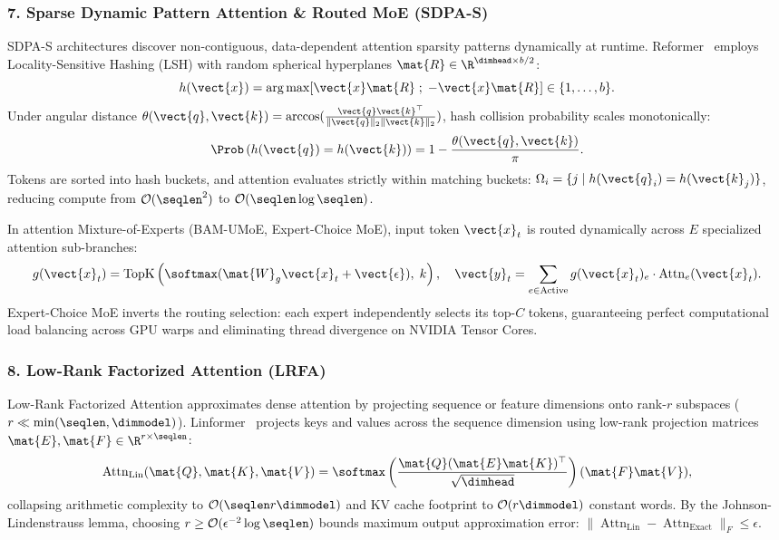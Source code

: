 \subsubsection{7. Sparse Dynamic Pattern Attention \& Routed MoE (SDPA-S)}
\label{subsubsec:sdpas_contract}
SDPA-S architectures discover non-contiguous, data-dependent attention sparsity patterns dynamically at runtime. Reformer~\cite{kitaev2020reformer} employs Locality-Sensitive Hashing (LSH) with random spherical hyperplanes $\mat{R} \in \R^{\dimhead \times b/2}$:
\begin{equation}
h(\vect{x}) = \arg\max [\vect{x}\mat{R} \;;\; -\vect{x}\mat{R}] \in \{1, \dots, b\}.
\end{equation}
Under angular distance $\theta(\vect{q}, \vect{k}) = \arccos(\frac{\vect{q}\vect{k}^\top}{\|\vect{q}\|_2 \|\vect{k}\|_2})$, hash collision probability scales monotonically:
\begin{equation}
\Prob\left( h(\vect{q}) = h(\vect{k}) \right) = 1 - \frac{\theta(\vect{q}, \vect{k})}{\pi}.
\end{equation}
Tokens are sorted into hash buckets, and attention evaluates strictly within matching buckets: $\Omega_i = \{j \mid h(\vect{q}_i) = h(\vect{k}_j)\}$, reducing compute from $\mathcal{O}(\seqlen^2)$ to $\mathcal{O}(\seqlen \log \seqlen)$.

In attention Mixture-of-Experts (BAM-UMoE, Expert-Choice MoE), input token $\vect{x}_t$ is routed dynamically across $E$ specialized attention sub-branches:
\begin{equation}
g(\vect{x}_t) = \operatorname{TopK}\left( \softmax(\mat{W}_g \vect{x}_t + \vect{\epsilon}), \; k \right), \quad \vect{y}_t = \sum_{e \in \text{Active}} g(\vect{x}_t)_e \cdot \operatorname{Attn}_e(\vect{x}_t).
\end{equation}
Expert-Choice MoE inverts the routing selection: each expert independently selects its top-$C$ tokens, guaranteeing perfect computational load balancing across GPU warps and eliminating thread divergence on NVIDIA Tensor Cores.

\subsubsection{8. Low-Rank Factorized Attention (LRFA)}
\label{subsubsec:lrfa_contract}
Low-Rank Factorized Attention approximates dense attention by projecting sequence or feature dimensions onto rank-$r$ subspaces ($r \ll \min(\seqlen, \dimmodel)$). Linformer~\cite{wang2020linformer} projects keys and values across the sequence dimension using low-rank projection matrices $\mat{E}, \mat{F} \in \R^{r \times \seqlen}$:
\begin{equation}
\operatorname{Attn}_{\text{Lin}}(\mat{Q}, \mat{K}, \mat{V}) = \softmax\left( \frac{\mat{Q} (\mat{E}\mat{K})^\top}{\sqrt{\dimhead}} \right) (\mat{F}\mat{V}),
\end{equation}
collapsing arithmetic complexity to $\mathcal{O}(\seqlen r \dimmodel)$ and KV cache footprint to $\mathcal{O}(r \dimmodel)$ constant words. By the Johnson-Lindenstrauss lemma, choosing $r \ge \mathcal{O}(\epsilon^{-2} \log \seqlen)$ bounds maximum output approximation error: $\|\operatorname{Attn}_{\text{Lin}} - \operatorname{Attn}_{\text{Exact}}\|_F \le \epsilon$.


